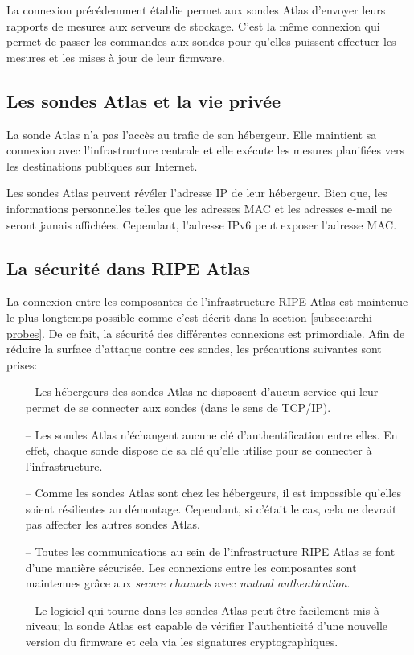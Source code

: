 La connexion précédemment établie permet aux sondes Atlas d'envoyer leurs  rapports de mesures  aux serveurs de stockage. C'est la même connexion qui permet de passer les commandes aux sondes pour qu'elles puissent effectuer les mesures et les mises à jour de leur firmware.




\subsection{Les sondes  Atlas et la vie privée}
La sonde  Atlas n'a pas l'accès au trafic de son hébergeur. Elle maintient sa connexion avec l'infrastructure centrale et elle exécute les mesures planifiées vers les destinations publiques sur Internet. 

Les sondes  Atlas peuvent révéler l'adresse IP de leur hébergeur. Bien que, les informations personnelles telles que les adresses MAC et les adresses e-mail ne seront jamais affichées. Cependant, l'adresse IPv6 peut exposer l'adresse MAC. 

\subsection{La sécurité dans RIPE Atlas}

La connexion entre les composantes de l'infrastructure RIPE Atlas est maintenue le plus longtemps possible comme c'est décrit dans  la section \ref{subsec:archi-probes}. De ce fait, la sécurité des différentes connexions est primordiale. Afin de réduire la surface d'attaque contre ces sondes, les précautions suivantes sont prises:

\begin{itemize}
	\item[--] Les  hébergeurs des sondes  Atlas ne disposent d'aucun service qui leur permet de se connecter aux sondes (dans le sens de TCP/IP).
	\item[--] Les sondes   Atlas n'échangent aucune clé d'authentification entre elles. En effet, chaque sonde dispose de sa clé qu'elle utilise pour se connecter à l'infrastructure.
	\item[--] Comme les sondes  Atlas sont chez les hébergeurs, il est impossible qu'elles soient résilientes au démontage. Cependant, si c'était le cas, cela ne devrait pas affecter les autres sondes  Atlas.
	\item[--] Toutes les communications au sein de l'infrastructure RIPE Atlas se font d'une manière sécurisée. Les connexions entre les composantes sont maintenues grâce aux \textit{secure channels} avec \textit{mutual authentication}.
	\item[--] Le logiciel qui tourne dans les sondes  Atlas peut être facilement mis à niveau; la sonde  Atlas est capable de vérifier l'authenticité d'une nouvelle version du firmware et cela via les signatures cryptographiques. 
\end{itemize}

